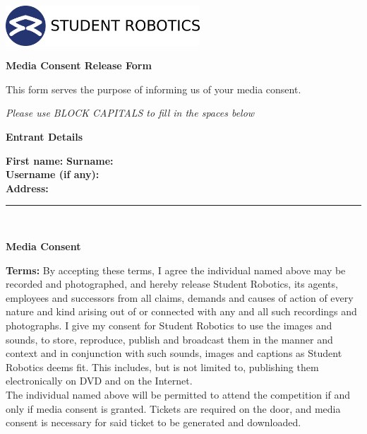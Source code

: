 \documentclass[a4paper,10pt]{article}
\newcommand{\textfield}[1]{\textbf{#1:} \hrulefill\hspace{0mm}}
\newcommand{\fieldsep}{\\[2.5mm]}
\newcommand{\textfieldline}{{\hrule\hspace{2mm}\fieldsep}}
\begin{document}
\pagestyle{empty}

\begin{minipage}[c]{0.38\textwidth}
\includegraphics[height=1.5cm]{logo}
\end{minipage}
\hspace{0.12\textwidth}
\begin{minipage}[c]{0.48\textwidth}
\begin{center}
{\LARGE \textbf{Media Consent Release Form} \par}
\end{center}
\end{minipage}
\vspace{1cm}

This form serves the purpose of informing us of your media consent.
\begin{center}
\textit{Please use BLOCK CAPITALS to fill in the spaces below}
\end{center}

\textbf{\large Entrant Details}\\\vspace{-2mm}

\textfield{First name}  \textfield{Surname} \fieldsep
\textfield{Username (if any)} \fieldsep
\textfield{Address} \fieldsep
\textfieldline


\textbf{\large Media Consent}\\\vspace{-3mm}

\textbf{Terms:} By accepting these terms, I agree the individual named above may be recorded and photographed, and hereby release Student Robotics, its agents, employees and successors from all claims, demands and causes of action of every nature and kind arising out of or connected with any and all such recordings and photographs.
I give my consent for Student Robotics to use the images and sounds, to store, reproduce, publish and broadcast them in the manner and context and in conjunction with such sounds, images and captions as Student Robotics deems fit.
This includes, but is not limited to, publishing them electronically on DVD and on the Internet.\\

The individual named above will be permitted to attend the competition if and only if media consent is granted.
Tickets are required on the door, and media consent is necessary for said ticket to be generated and downloaded.\\
\end{document}
